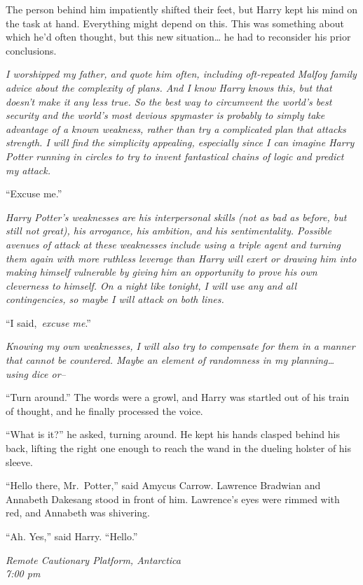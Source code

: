 The person behind him impatiently shifted their feet, but Harry kept his
mind on the task at hand. Everything might depend on this. This was
something about which he'd often thought, but this new situation\ldots{}
he had to reconsider his prior conclusions.

\emph{I worshipped my father, and quote him often, including
oft-repeated Malfoy family advice about the complexity of plans. And I
know Harry knows this, but that doesn't make it any less true. So the
best way to circumvent the world's best security and the world's most
devious spymaster is probably to simply take advantage of a known
weakness, rather than try a complicated plan that attacks strength. I
will find the simplicity appealing, especially since I can imagine Harry
Potter running in circles to try to invent fantastical chains of logic
and predict my attack.}

``Excuse me.''

\emph{Harry Potter's weaknesses are his interpersonal skills (not as bad
as before, but still not great), his arrogance, his ambition, and his
sentimentality. Possible avenues of attack at these weaknesses include
using a triple agent and turning them again with more ruthless leverage
than Harry will exert or drawing him into making himself vulnerable by
giving him an opportunity to prove his own cleverness to himself. On a
night like tonight, I will use any and all contingencies, so maybe I
will attack on both lines.}

``I said,~\emph{excuse me}.''

\emph{Knowing my own weaknesses, I will also try to compensate for them
in a manner that cannot be countered. Maybe an element of randomness in
my planning\ldots{} using dice or--}

``Turn around.'' The words were a growl, and Harry was startled out of
his train of thought, and he finally processed the voice.

``What is it?'' he asked, turning around. He kept his hands clasped
behind his back, lifting the right one enough to reach the wand in the
dueling holster of his sleeve.

``Hello there, Mr.~Potter,'' said Amycus Carrow. Lawrence Bradwian and
Annabeth Dakesang stood in front of him. Lawrence's eyes were rimmed
with red, and Annabeth was shivering.

``Ah. Yes,'' said Harry. ``Hello.''

\mybreak

\emph{Remote Cautionary Platform, Antarctica}\\
\emph{7:00 pm}\\

